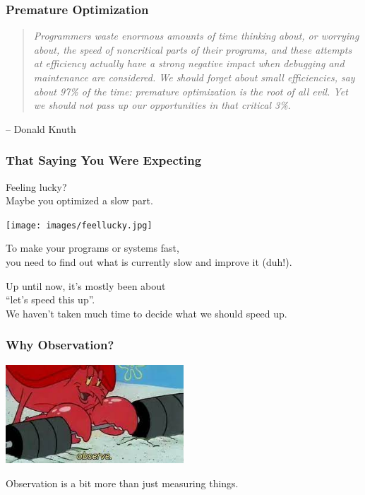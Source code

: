 \begin{frame}
\frametitle{Premature Optimization}

\vspace*{.5cm}

\begin{quote}
\textit{Programmers waste enormous amounts of time thinking about, or worrying about, the speed of noncritical parts of their programs, and these attempts at efficiency actually have a strong negative impact when debugging and maintenance are considered. We should forget about small efficiencies, say about 97\% of the time: premature optimization is the root of all evil. Yet we should not pass up our opportunities in that critical 3\%.}
\end{quote}
	\hfill -- Donald Knuth


\end{frame}



\begin{frame}
\frametitle{That Saying You Were Expecting}


Feeling lucky? \\
Maybe you optimized a slow part. 

\begin{center}
	\texttt{[image: images/feellucky.jpg]}
\end{center}

To make your programs or systems fast, \\
you need to find out what is currently slow and improve it (duh!). 

Up until now, it's mostly been about \\
\qquad ``let's speed this up''.\\
We haven't taken much time to decide what we should speed up.

\end{frame}


\begin{frame}
\frametitle{Why Observation?}

\begin{center}
	\includegraphics[width=0.5\textwidth]{images/observe.jpg}
\end{center}

Observation is a bit more than just measuring things.

\end{frame}


